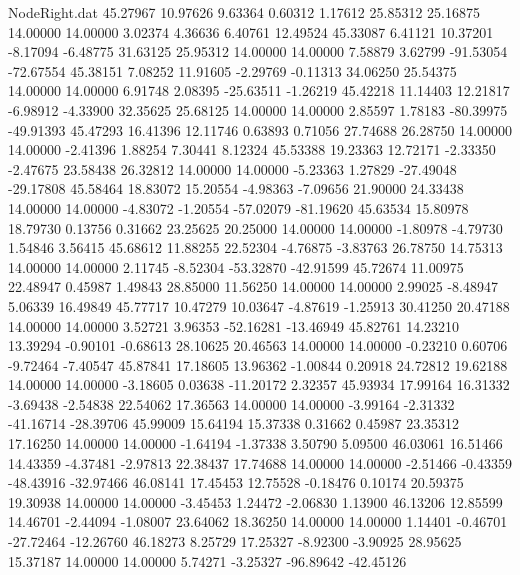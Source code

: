 \begin{filecontents}{NodeRight.dat}
  45.27967   10.97626    9.63364     0.60312    1.17612   25.85312   25.16875   14.00000   14.00000    3.02374    4.36636    6.40761   12.49524
  45.33087    6.41121   10.37201    -8.17094   -6.48775   31.63125   25.95312   14.00000   14.00000    7.58879    3.62799  -91.53054  -72.67554
  45.38151    7.08252   11.91605    -2.29769   -0.11313   34.06250   25.54375   14.00000   14.00000    6.91748    2.08395  -25.63511   -1.26219
  45.42218   11.14403   12.21817    -6.98912   -4.33900   32.35625   25.68125   14.00000   14.00000    2.85597    1.78183  -80.39975  -49.91393
  45.47293   16.41396   12.11746     0.63893    0.71056   27.74688   26.28750   14.00000   14.00000   -2.41396    1.88254    7.30441    8.12324
  45.53388   19.23363   12.72171    -2.33350   -2.47675   23.58438   26.32812   14.00000   14.00000   -5.23363    1.27829  -27.49048  -29.17808
  45.58464   18.83072   15.20554    -4.98363   -7.09656   21.90000   24.33438   14.00000   14.00000   -4.83072   -1.20554  -57.02079  -81.19620
  45.63534   15.80978   18.79730     0.13756    0.31662   23.25625   20.25000   14.00000   14.00000   -1.80978   -4.79730    1.54846    3.56415
  45.68612   11.88255   22.52304    -4.76875   -3.83763   26.78750   14.75313   14.00000   14.00000    2.11745   -8.52304  -53.32870  -42.91599
  45.72674   11.00975   22.48947     0.45987    1.49843   28.85000   11.56250   14.00000   14.00000    2.99025   -8.48947    5.06339   16.49849
  45.77717   10.47279   10.03647    -4.87619   -1.25913   30.41250   20.47188   14.00000   14.00000    3.52721    3.96353  -52.16281  -13.46949
  45.82761   14.23210   13.39294    -0.90101   -0.68613   28.10625   20.46563   14.00000   14.00000   -0.23210    0.60706   -9.72464   -7.40547
  45.87841   17.18605   13.96362    -1.00844    0.20918   24.72812   19.62188   14.00000   14.00000   -3.18605    0.03638  -11.20172    2.32357
  45.93934   17.99164   16.31332    -3.69438   -2.54838   22.54062   17.36563   14.00000   14.00000   -3.99164   -2.31332  -41.16714  -28.39706
  45.99009   15.64194   15.37338     0.31662    0.45987   23.35312   17.16250   14.00000   14.00000   -1.64194   -1.37338    3.50790    5.09500
  46.03061   16.51466   14.43359    -4.37481   -2.97813   22.38437   17.74688   14.00000   14.00000   -2.51466   -0.43359  -48.43916  -32.97466
  46.08141   17.45453   12.75528    -0.18476    0.10174   20.59375   19.30938   14.00000   14.00000   -3.45453    1.24472   -2.06830    1.13900
  46.13206   12.85599   14.46701    -2.44094   -1.08007   23.64062   18.36250   14.00000   14.00000    1.14401   -0.46701  -27.72464  -12.26760
  46.18273    8.25729   17.25327    -8.92300   -3.90925   28.95625   15.37187   14.00000   14.00000    5.74271   -3.25327  -96.89642  -42.45126

\end{filecontents}
